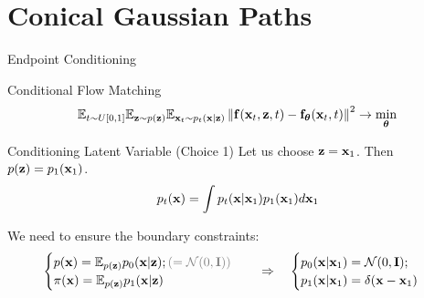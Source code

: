 \documentclass{beamer}
\begin{document}
\section{Conical Gaussian Paths}
\begin{frame}{Endpoint Conditioning}
	\begin{block}{Conditional Flow Matching}
		\vspace{-0.3cm}
		\[
			\mathbb{E}_{t \sim U[0, 1]} \mathbb{E}_{\mathbf{z} \sim p(\mathbf{z})} \mathbb{E}_{\mathbf{x}_t \sim p_t(\mathbf{x} | \mathbf{z})}\left\| \mathbf{f}(\mathbf{x}_t, \mathbf{z}, t) - \mathbf{f}_{\boldsymbol{\theta}}(\mathbf{x}_t, t) \right\|^2 \rightarrow \min_{\boldsymbol{\theta}}
		\]
		\vspace{-0.3cm}
	\end{block}
	\begin{block}{Conditioning Latent Variable (Choice 1)}
		Let us choose $\mathbf{z} = \mathbf{x}_1$. Then $p(\mathbf{z}) = p_1(\mathbf{x}_1)$.
		\[
			p_t(\mathbf{x}) = \int p_t(\mathbf{x} | \mathbf{x}_1) p_1(\mathbf{x}_1) d \mathbf{x}_1
		\]
	\end{block}
	We need to ensure the boundary constraints:
	\[
		\begin{cases}
			p(\bx) = \bbE_{p(\bz)} p_0(\bx | \bz); {\color{gray}(= \cN(0, \bI))} \\
			\pi(\bx) = \bbE_{p(\bz)} p_1(\bx | \bz)
		\end{cases}
		\quad \Rightarrow \quad 
		\begin{cases}
			p_0(\bx | \bx_1) = \cN(0, \bI); \\
			p_1(\bx | \bx_1) = \delta(\bx - \bx_1)
		\end{cases}
	\]
	\vspace{-0.3cm}
\end{frame}
\end{document}
